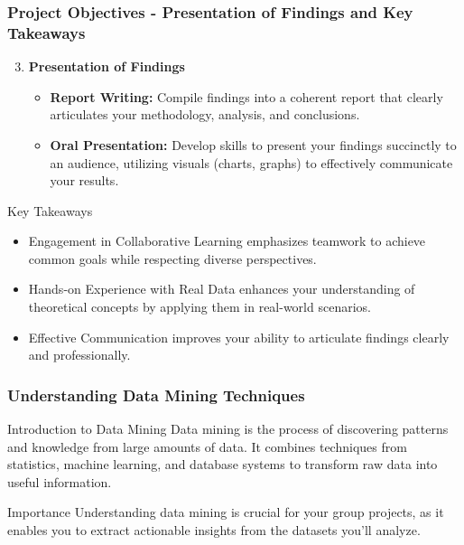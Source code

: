 \documentclass[aspectratio=169]{beamer}
\begin{document}
\begin{frame}[fragile]
    \frametitle{Project Objectives - Presentation of Findings and Key Takeaways}
    \begin{enumerate}
        \setcounter{enumi}{2}
        \item \textbf{Presentation of Findings}
        \begin{itemize}
            \item \textbf{Report Writing:} Compile findings into a coherent report that clearly articulates your methodology, analysis, and conclusions.
            \item \textbf{Oral Presentation:} Develop skills to present your findings succinctly to an audience, utilizing visuals (charts, graphs) to effectively communicate your results.
        \end{itemize}
    \end{enumerate}

    \begin{block}{Key Takeaways}
        \begin{itemize}
            \item Engagement in Collaborative Learning emphasizes teamwork to achieve common goals while respecting diverse perspectives.
            \item Hands-on Experience with Real Data enhances your understanding of theoretical concepts by applying them in real-world scenarios.
            \item Effective Communication improves your ability to articulate findings clearly and professionally.
        \end{itemize}
    \end{block}
\end{frame}

\begin{frame}[fragile]
    \frametitle{Understanding Data Mining Techniques}
    \begin{block}{Introduction to Data Mining}
        Data mining is the process of discovering patterns and knowledge from large amounts of data. It combines techniques from statistics, machine learning, and database systems to transform raw data into useful information.
    \end{block}
    \begin{block}{Importance}
        Understanding data mining is crucial for your group projects, as it enables you to extract actionable insights from the datasets you'll analyze.
    \end{block}
\end{frame}
\end{document}
